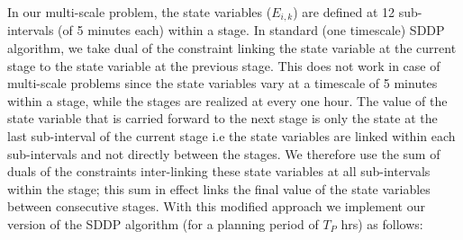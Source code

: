 \documentclass[11pt,twoside]{article}
\begin{document}
In our multi-scale problem, the state variables ($E_{i,k}$) are defined at 12 sub-intervals (of 5 minutes each) within a stage. In standard (one timescale) SDDP algorithm, we take dual of the constraint linking the state variable at the current stage to the state variable at the previous stage. This does not work in case of multi-scale problems since the state variables vary at a timescale of 5 minutes within a stage, while the stages are realized at every one hour. The value of the state variable that is carried forward to the next stage is only the state at the last sub-interval of the current stage i.e the state variables are linked within each sub-intervals and not directly between the stages. We therefore use the sum of duals of the constraints inter-linking these state variables at all sub-intervals within the stage; this sum in effect links the final value of the state variables between consecutive stages. With this modified approach we implement our version of the SDDP algorithm (for a planning period of $T_{P}$ hrs) as follows:    
\end{document}
